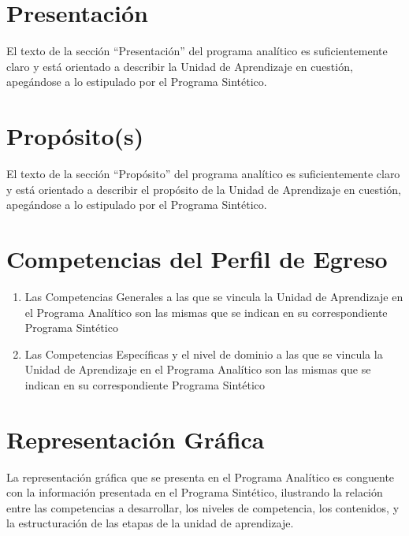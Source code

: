 \documentclass{article}
\newcounter{boxcount}
\newcommand{\sino}{\hfill \CheckBox[name=yesbox\refstepcounter{boxcount},checkboxsymbol=\ding{56}]{S\'{i}}%
  \quad%
  \CheckBox[name=nobox\refstepcounter{boxcount},checkboxsymbol=\ding{56}]{No}}
\begin{document}
\begin{Form}
\begin{enumerate}[resume,leftmargin=*,nolistsep]
\end{enumerate}
  
\section{Presentaci\'{o}n}

El texto de la secci\'{o}n ``Presentaci\'{o}n'' del programa
anal\'{i}tico es suficientemente claro y est\'{a} orientado a
describir la Unidad de Aprendizaje en cuesti\'{o}n, apeg\'{a}ndose a
lo estipulado por el Programa Sint\'{e}tico. \sino

\section{Prop\'{o}sito(s)}

El texto de la secci\'{o}n ``Prop\'{o}sito'' del programa
anal\'{i}tico es suficientemente claro y est\'{a} orientado a
describir el prop\'{o}sito de la Unidad de Aprendizaje en
cuesti\'{o}n, apeg\'{a}ndose a lo estipulado por el Programa
Sint\'{e}tico. \sino

\section{Competencias del Perfil de Egreso}

\begin{enumerate}[resume,leftmargin=*,nolistsep]
\item{Las Competencias Generales a las que se vincula la Unidad de Aprendizaje en el
Programa Anal\'{i}tico son las mismas que se indican en su correspondiente Programa
Sint\'{e}tico \sino}
\item{Las Competencias Espec\'{i}ficas y el nivel de dominio a las que se vincula la Unidad de
Aprendizaje en el Programa Anal\'{i}tico son las mismas que se indican en su correspondiente
Programa Sint\'{e}tico \sino}
\end{enumerate}

\section{Representaci\'{o}n Gr\'{a}fica}

La representaci\'{o}n gr\'{a}fica que se presenta en el Programa Anal\'{i}tico es conguente con la
informaci\'{o}n presentada en el Programa Sint\'{e}tico, ilustrando la relaci\'{o}n entre las
competencias a desarrollar, los niveles de competencia, los contenidos, y la estructuraci\'{o}n
de las etapas de la unidad de aprendizaje. \sino


\end{Form}
\end{document}
